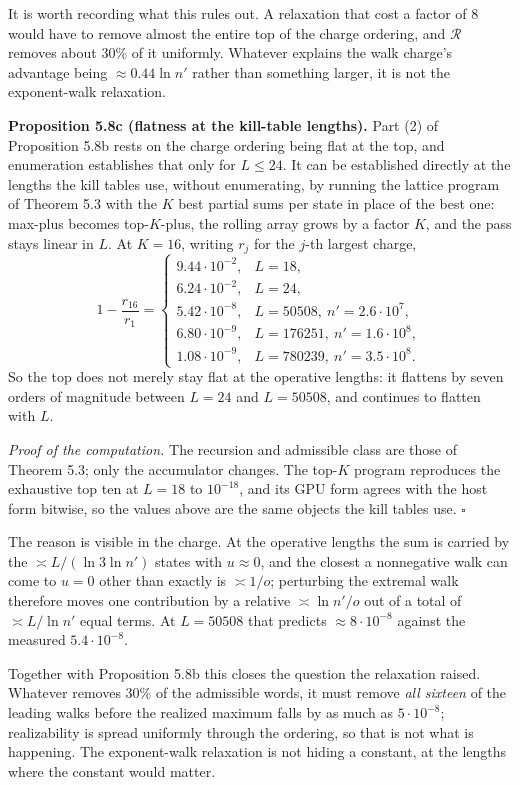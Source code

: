 \documentclass[12pt]{article}
\begin{document}
It is worth recording what this rules out. A relaxation that cost a
factor of \(8\) would have to remove almost the entire top of the charge
ordering, and \(\mathcal R\) removes about \(30\%\) of it uniformly.
Whatever explains the walk charge's advantage being
\(\approx0.44\ln n'\) rather than something larger, it is not the
exponent-walk relaxation.

\textbf{Proposition 5.8c (flatness at the kill-table lengths).} Part (2)
of Proposition 5.8b rests on the charge ordering being flat at the top,
and enumeration establishes that only for \(L\le24\). It can be
established directly at the lengths the kill tables use, without
enumerating, by running the lattice program of Theorem 5.3 with the
\(K\) best partial sums per state in place of the best one: max-plus
becomes top-\(K\)-plus, the rolling array grows by a factor \(K\), and
the pass stays linear in \(L\). At \(K=16\), writing \(r_j\) for the
\(j\)-th largest charge, \[
1-\frac{r_{16}}{r_1}=
\begin{cases}
9.44\cdot10^{-2}, & L=18,\\
6.24\cdot10^{-2}, & L=24,\\
5.42\cdot10^{-8}, & L=50508,\ n'=2.6\cdot10^{7},\\
6.80\cdot10^{-9}, & L=176251,\ n'=1.6\cdot10^{8},\\
1.08\cdot10^{-9}, & L=780239,\ n'=3.5\cdot10^{8}.
\end{cases}
\] So the top does not merely stay flat at the operative lengths: it
flattens by seven orders of magnitude between \(L=24\) and \(L=50508\),
and continues to flatten with \(L\).

\emph{Proof of the computation.} The recursion and admissible class are
those of Theorem 5.3; only the accumulator changes. The top-\(K\)
program reproduces the exhaustive top ten at \(L=18\) to \(10^{-18}\),
and its GPU form agrees with the host form bitwise, so the values above
are the same objects the kill tables use. \(\square\)

The reason is visible in the charge. At the operative lengths the sum is
carried by the \(\asymp L/(\ln3\ln n')\) states with \(u\approx0\), and
the closest a nonnegative walk can come to \(u=0\) other than exactly is
\(\asymp1/o\); perturbing the extremal walk therefore moves one
contribution by a relative \(\asymp\ln n'/o\) out of a total of
\(\asymp L/\ln n'\) equal terms. At \(L=50508\) that predicts
\(\approx8\cdot10^{-8}\) against the measured \(5.4\cdot10^{-8}\).

Together with Proposition 5.8b this closes the question the relaxation
raised. Whatever removes \(30\%\) of the admissible words, it must
remove \emph{all sixteen} of the leading walks before the realized
maximum falls by as much as \(5\cdot10^{-8}\); realizability is spread
uniformly through the ordering, so that is not what is happening. The
exponent-walk relaxation is not hiding a constant, at the lengths where
the constant would matter.
\end{document}
